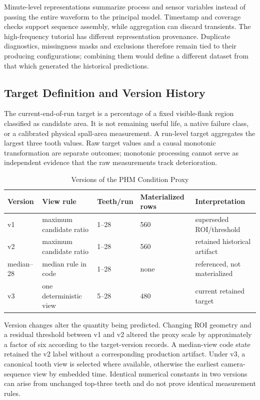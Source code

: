 Minute-level representations summarize process and sensor variables instead of passing
the entire waveform to the principal model. Timestamp and coverage checks support
sequence assembly, while aggregation can discard transients. The high-frequency tutorial
has different representation provenance. Duplicate diagnostics, missingness masks and
exclusions therefore remain tied to their producing configurations; combining them would
define a different dataset from that which generated the historical predictions.

\subsection{Target Definition and Version History}
The current-end-of-run target is a percentage of a fixed visible-flank region classified
as candidate area. It is not remaining useful life, a native failure class, or a
calibrated physical spall-area measurement. A run-level target aggregates the largest
three tooth values. Raw target values and a causal monotonic transformation are separate
outcomes; monotonic processing cannot serve as independent evidence that the raw
measurements track deterioration.

\begin{table}[htbp]
\caption{Versions of the PHM Condition Proxy}\label{tab:phm-target-lineage}
\centering\small
\begin{tabularx}{\textwidth}{@{}P{18mm}YP{18mm}P{23mm}Y@{}}\toprule
Version & View rule & Teeth/run & Materialized rows & Interpretation\\\midrule
v1 & maximum candidate ratio & 1--28 & 560 & superseded ROI/threshold\\
v2 & maximum candidate ratio & 1--28 & 560 & retained historical artifact\\
median--28 & median rule in code & 1--28 & none & referenced, not materialized\\
v3 & one deterministic view & 5--28 & 480 & current retained target\\\bottomrule
\end{tabularx}
\end{table}

Version changes alter the quantity being predicted. Changing ROI geometry and a residual
threshold between v1 and v2 altered the proxy scale by approximately a factor of six
according to the target-version records. A median-view code state retained the v2 label
without a corresponding production artifact. Under v3, a canonical tooth view is
selected where available, otherwise the earliest camera-sequence view by embedded time.
Identical numerical constants in two versions can arise from unchanged top-three teeth
and do not prove identical measurement rules.

